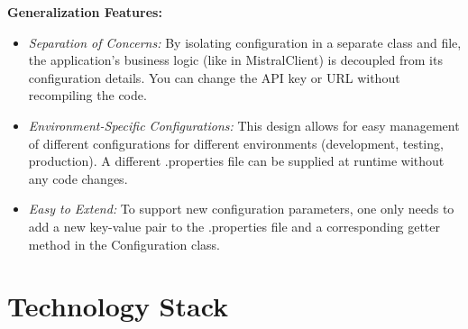 \documentclass{article}
\begin{document}
\textbf{Generalization Features:}
\begin{itemize}
    \item \textit{Separation of Concerns:} By isolating configuration in a separate class and file, the application's business logic (like in MistralClient) is decoupled from its configuration details. You can change the API key or URL without recompiling the code.
    \item \textit{Environment-Specific Configurations:} This design allows for easy management of different configurations for different environments (development, testing, production). A different .properties file can be supplied at runtime without any code changes.
    \item \textit{Easy to Extend:} To support new configuration parameters, one only needs to add a new key-value pair to the .properties file and a corresponding getter method in the Configuration class.
\end{itemize}

\section{Technology Stack}
\end{document}
